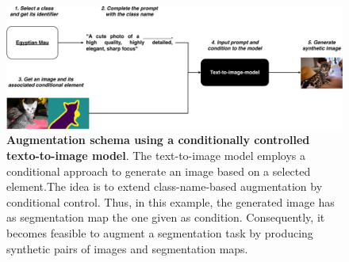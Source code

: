 \begin{figure}
    \centering
    \includegraphics[width=1\textwidth]{Pictures/control-augmentation.pdf}
    \caption{\textbf{Augmentation schema using a conditionally controlled texto-to-image model}. The text-to-image model employs a conditional approach to generate an image based on a selected element.The idea is to extend class-name-based augmentation by conditional control. Thus, in this example, the generated image has as segmentation map the one given as condition. Consequently, it becomes feasible to augment a segmentation task by producing synthetic pairs of images and segmentation maps.}
    \label{fig:condaug}
\end{figure}